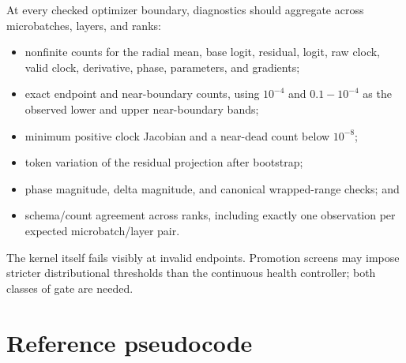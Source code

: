 \documentclass[11pt]{article}
\begin{document}
At every checked optimizer boundary, diagnostics should aggregate across microbatches, layers, and
ranks:
\begin{itemize}[leftmargin=1.8em]
  \item nonfinite counts for the radial mean, base logit, residual, logit, raw clock, valid clock,
        derivative, phase, parameters, and gradients;
  \item exact endpoint and near-boundary counts, using $10^{-4}$ and $0.1-10^{-4}$ as the observed
        lower and upper near-boundary bands;
  \item minimum positive clock Jacobian and a near-dead count below $10^{-8}$;
  \item token variation of the residual projection after bootstrap;
  \item phase magnitude, delta magnitude, and canonical wrapped-range checks; and
  \item schema/count agreement across ranks, including exactly one observation per expected
        microbatch/layer pair.
\end{itemize}
The kernel itself fails visibly at invalid endpoints.  Promotion screens may impose stricter
distributional thresholds than the continuous health controller; both classes of gate are needed.

\section{Reference pseudocode}
\end{document}
